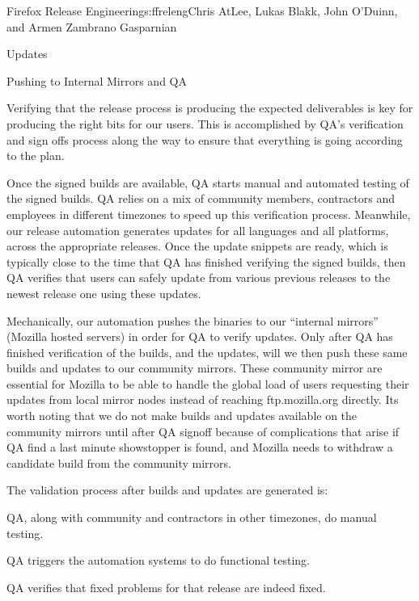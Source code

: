 \begin{aosachapter}{Firefox Release Engineering}{s:ffreleng}{Chris AtLee, Lukas Blakk, John O'Duinn, and Armen Zambrano Gasparnian}
\begin{aosasect1}{Updates}
\end{aosasect1}

\begin{aosasect1}{Pushing to Internal Mirrors and QA}

Verifying that the release process is producing the expected
deliverables is key for producing the right bits for our users. This
is accomplished by QA's verification and sign offs process along the
way to ensure that everything is going according to the plan.

Once the signed builds are available, QA starts manual and automated
testing of the signed builds. QA relies on a mix of community members,
contractors and employees in different timezones to speed up this
verification process. Meanwhile, our release automation generates
updates for all languages and all platforms, across the appropriate
releases. Once the update snippets are ready, which is typically close
to the time that QA has finished verifying the signed builds, then QA
verifies that users can safely update from various previous releases
to the newest release one using these updates.

Mechanically, our automation pushes the binaries to our ``internal
mirrors'' (Mozilla hosted servers) in order for QA to verify
updates. Only after QA has finished verification of the builds, and
the updates, will we then push these same builds and updates to our
community mirrors. These community mirror are essential for Mozilla to
be able to handle the global load of users requesting their updates
from local mirror nodes instead of reaching ftp.mozilla.org
directly. Its worth noting that we do not make builds and updates
available on the community mirrors until after QA signoff because of
complications that arise if QA find a last minute showstopper is
found, and Mozilla needs to withdraw a candidate build from the
community mirrors.

The validation process after builds and updates are generated is:

\begin{aosaitemize}

\item QA, along with community and contractors in other timezones, do
  manual testing.

\item QA triggers the automation systems to do functional testing.

\item QA verifies that fixed problems for that release are indeed
  fixed.


\end{aosaitemize}
\end{aosasect1}
\end{aosachapter}
